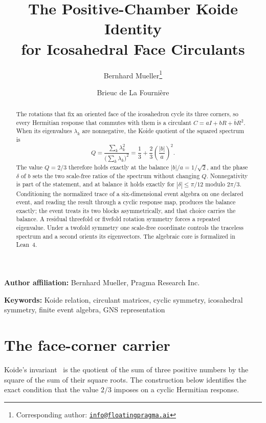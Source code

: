 \documentclass[11pt]{article}
\title{\textbf{The Positive-Chamber Koide Identity\\
for Icosahedral Face Circulants}}
\author{Bernhard Mueller\thanks{Corresponding author:
\href{mailto:info@floatingpragma.ai}{\texttt{info@floatingpragma.ai}}}
\and Brieuc de La Fourni\`ere}
\date{\OPHPaperReleaseDate}
\theoremstyle{remark}
\begin{document}
\maketitle
\OPHPaperReleaseBanner

\begin{center}
\small\textbf{Author affiliation:} Bernhard Mueller, Pragma Research Inc.
\end{center}

\begin{abstract}
The rotations that fix an oriented face of the icosahedron cycle its three
corners, so every Hermitian response that commutes with them is a circulant
\(C=aI+bR+\overline bR^2\). When its eigenvalues \(\lambda_k\) are
nonnegative, the Koide quotient of the squared spectrum is
\[
Q=\frac{\sum_k\lambda_k^2}{\bigl(\sum_k\lambda_k\bigr)^2}
 =\frac13+\frac23\left(\frac{|b|}{a}\right)^2 .
\]
The value \(Q=2/3\) therefore holds exactly at the balance
\(|b|/a=1/\sqrt2\), and the phase \(\delta\) of \(b\) sets the two scale-free
ratios of the spectrum without changing \(Q\). Nonnegativity is part of the
statement, and at balance it holds exactly for \(|\delta|\le\pi/12\) modulo
\(2\pi/3\). Conditioning the normalized trace of a six-dimensional event
algebra on one declared event, and reading the result through a cyclic
response map, produces the balance exactly; the event treats its two blocks
asymmetrically, and that choice carries the balance. A residual threefold or
fivefold rotation symmetry forces a repeated eigenvalue. Under a twofold
symmetry one scale-free coordinate controls the traceless spectrum and a
second orients its eigenvectors. The
algebraic core is formalized in Lean~4.
\end{abstract}

\noindent\textbf{Keywords:} Koide relation, circulant matrices, cyclic
symmetry, icosahedral symmetry, finite event algebra, GNS representation


\section{The face-corner carrier}

Koide's invariant~\cite{koide1983} is the quotient of the sum of three
positive numbers by the square of the sum of their square roots. The
construction below identifies the exact condition that the value \(2/3\)
imposes on a cyclic Hermitian response.
\end{document}
